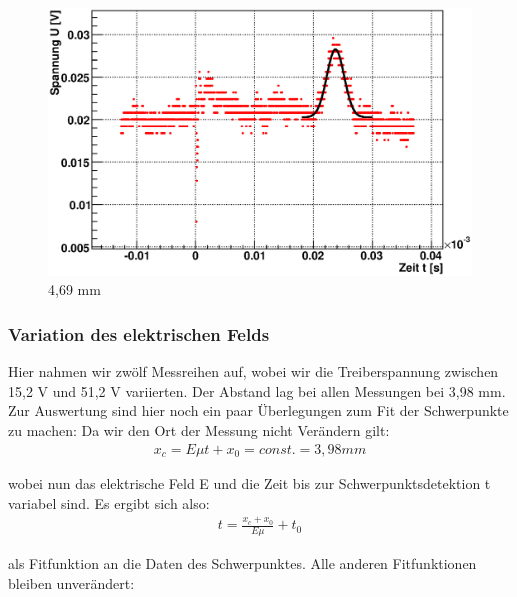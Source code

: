 \documentclass[12pt]{article}
\begin{document}
\begin{figure}[H]  
\begin{minipage}{0.33\linewidth}
\centering
\includegraphics[width=0.9\linewidth]{pictures/varDist/05.eps}
\small{4,69 mm}
\end{minipage}
\begin{minipage}{0.33\linewidth}
\centering
\end{minipage}
\begin{minipage}{0.33\linewidth}
\centering 
\end{minipage}
\end{figure}
\newpage

\subsubsection{Variation des elektrischen Felds}
Hier nahmen wir zwölf Messreihen auf, wobei wir die Treiberspannung zwischen 15,2 V und 51,2 V variierten. Der Abstand lag bei allen Messungen bei 3,98 mm. Zur Auswertung sind hier noch ein paar Überlegungen zum Fit der Schwerpunkte zu machen: Da wir den Ort der Messung nicht Verändern gilt:
\begin{align*}
 x_c = E \mu t + x_0 = const. = 3,98 mm
\end{align*}

wobei nun das elektrische Feld E und die Zeit bis zur Schwerpunktsdetektion t variabel sind. Es ergibt sich also:
\begin{align*}
 t = \frac{x_c+x_0}{E \mu} + t_0
\end{align*}

als Fitfunktion an die Daten des Schwerpunktes. Alle anderen Fitfunktionen bleiben unverändert:
\end{document}
